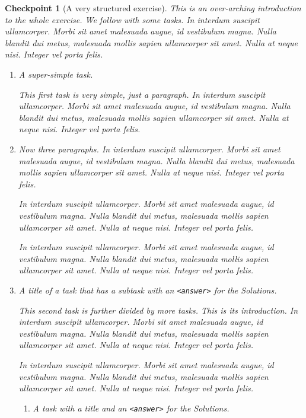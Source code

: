 \documentclass{sn-jnl}
\theoremstyle{thmstyleone}%
\theoremstyle{thmstyletwo}%
\newtheorem{inlineexercise}[theorem]{Checkpoint}
\theoremstyle{thmstylethree}%
\newcommand{\mono}[1]{\texttt{#1}}
\newcommand{\lititle}[1]{{\slshape#1}}
\numberwithin{equation}{section}
\begin{document}
\begin{inlineexercise}[A very structured exercise]\label{exercise-structured}%
%
This is an over-arching introduction to the whole exercise.  We follow with some tasks.  In interdum suscipit ullamcorper. Morbi sit amet malesuada augue, id vestibulum magna. Nulla blandit dui metus, malesuada mollis sapien ullamcorper sit amet. Nulla at neque nisi. Integer vel porta felis.%
\begin{enumerate}[font=\bfseries,label=(\alph*),ref=\alph*]%
\item{}\lititle{A super-simple task.}\par%
This first task is very simple, just a paragraph.  In interdum suscipit ullamcorper. Morbi sit amet malesuada augue, id vestibulum magna. Nulla blandit dui metus, malesuada mollis sapien ullamcorper sit amet. Nulla at neque nisi. Integer vel porta felis.%
\item{}Now three paragraphs.  In interdum suscipit ullamcorper. Morbi sit amet malesuada augue, id vestibulum magna. Nulla blandit dui metus, malesuada mollis sapien ullamcorper sit amet. Nulla at neque nisi. Integer vel porta felis.%
\par
In interdum suscipit ullamcorper. Morbi sit amet malesuada augue, id vestibulum magna. Nulla blandit dui metus, malesuada mollis sapien ullamcorper sit amet. Nulla at neque nisi. Integer vel porta felis.%
\par
In interdum suscipit ullamcorper. Morbi sit amet malesuada augue, id vestibulum magna. Nulla blandit dui metus, malesuada mollis sapien ullamcorper sit amet. Nulla at neque nisi. Integer vel porta felis.%
\item{}\lititle{A title of a task that has a subtask with an \mono{<answer>} for the Solutions.}\par%
This second task is further divided by more tasks.  This is its introduction.  In interdum suscipit ullamcorper. Morbi sit amet malesuada augue, id vestibulum magna. Nulla blandit dui metus, malesuada mollis sapien ullamcorper sit amet. Nulla at neque nisi. Integer vel porta felis.%
\par
In interdum suscipit ullamcorper. Morbi sit amet malesuada augue, id vestibulum magna. Nulla blandit dui metus, malesuada mollis sapien ullamcorper sit amet. Nulla at neque nisi. Integer vel porta felis.%
\begin{enumerate}[font=\bfseries,label=(\roman*),ref=\theenumi.\roman*]%
\item{}\lititle{A task with a title and an \mono{<answer>} for the Solutions.}\par%

\end{enumerate}
\end{enumerate}
\end{inlineexercise}
\end{document}
